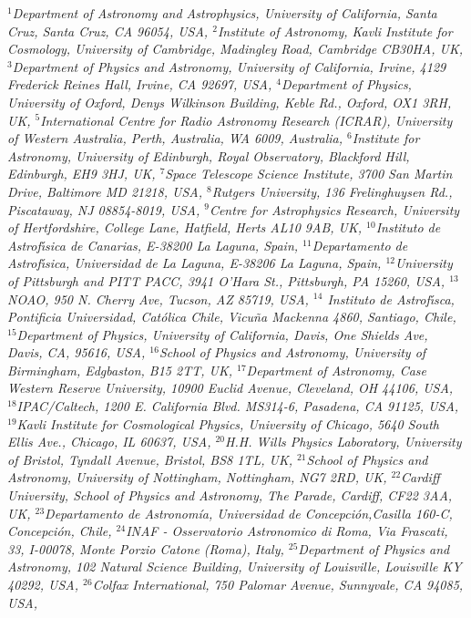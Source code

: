 {\justify\it\small
$^{1}$Department of Astronomy and Astrophysics, University of California, Santa Cruz, Santa Cruz, CA 96054, USA,
$^{2}$Institute of Astronomy, Kavli Institute for Cosmology, University of Cambridge, Madingley Road, Cambridge CB30HA, UK,
$^{3}$Department of Physics and Astronomy, University of California, Irvine, 4129 Frederick Reines Hall, Irvine, CA 92697, USA,
$^{4}$Department of Physics, University of Oxford, Denys Wilkinson Building, Keble Rd., Oxford, OX1 3RH, UK,
$^{5}$International Centre for Radio Astronomy Research (ICRAR), University of Western Australia, Perth, Australia, WA 6009, Australia,
$^{6}$Institute for Astronomy, University of Edinburgh, Royal Observatory, Blackford Hill, Edinburgh, EH9 3HJ, UK,
$^{7}$Space Telescope Science Institute, 3700 San Martin Drive, Baltimore MD 21218, USA,
$^{8}$Rutgers University, 136 Frelinghuysen Rd., Piscataway, NJ 08854-8019, USA,
$^{9}$Centre for Astrophysics Research, University of Hertfordshire, College Lane, Hatfield, Herts AL10 9AB, UK,
$^{10}$Instituto de Astrof\'\i sica de Canarias, E-38200 La Laguna, Spain,
$^{11}$Departamento de Astrof\'\i sica, Universidad de La Laguna, E-38206 La Laguna, Spain,
$^{12}$University of Pittsburgh and PITT PACC, 3941 O{'}Hara St., Pittsburgh, PA 15260, USA,
$^{13}$NOAO, 950 N. Cherry Ave, Tucson, AZ 85719, USA,
$^{14}$ Instituto de Astrof\'\i sca, Pontificia Universidad,
Cat{\'{o}}lica Chile, Vicu{\~{n}}a Mackenna 4860, Santiago, Chile,
$^{15}$Department of Physics, University of California, Davis, One Shields Ave, Davis, CA, 95616, USA,
$^{16}$School of Physics and Astronomy, University of Birmingham, Edgbaston, B15 2TT, UK,
$^{17}$Department of Astronomy, Case Western Reserve University, 10900 Euclid Avenue, Cleveland, OH 44106, USA,
$^{18}$IPAC/Caltech, 1200 E. California Blvd. MS314-6, Pasadena, CA 91125, USA,
$^{19}$Kavli Institute for Cosmological Physics, University of Chicago, 5640 South Ellis Ave., Chicago, IL 60637, USA,
$^{20}$H.H. Wills Physics Laboratory, University of Bristol, Tyndall Avenue, Bristol, BS8 1TL, UK,
$^{21}$School of Physics and Astronomy, University of Nottingham, Nottingham, NG7 2RD, UK,
$^{22}$Cardiff University, School of Physics and Astronomy, The Parade, Cardiff, CF22 3AA, UK,
$^{23}$Departamento de Astronomía, Universidad de Concepci{\'{o}}n,Casilla 160-C, Concepción, Chile,
$^{24}$INAF - Osservatorio Astronomico di Roma, Via Frascati, 33, I-00078, Monte Porzio Catone (Roma), Italy,
$^{25}$Department of Physics and Astronomy, 102 Natural Science Building, University of Louisville, Louisville KY 40292, USA,
$^{26}$Colfax International, 750 Palomar Avenue, Sunnyvale, CA 94085, USA,
}
